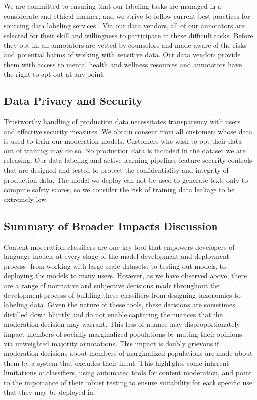 \documentclass[letterpaper]{article} %
\begin{document}
We are committed to ensuring that our labeling tasks are managed in a considerate and ethical manner, and we strive to follow current best practices for sourcing data labeling services \cite{pai2021}. Via our data vendors, all of our annotators are selected for their skill and willingness to participate in these difficult tasks. Before they opt in, all annotators are vetted by counselors and made aware of the risks and potential harms of working with sensitive data.  Our data vendors provide them with access to mental health and wellness resources and annotators have the right to opt out at any point.


\subsection{Data Privacy and Security}

Trustworthy handling of production data necessitates transparency with users and effective security measures. We obtain consent from all customers whose data is used to train our moderation models. Customers who wish to opt their data out of training may do so. No production data is included in the dataset we are releasing. Our data labeling and active learning pipelines feature security controls that are designed and tested to protect the confidentiality and integrity of production data. The model we deploy can not be used to generate text, only to compute safety scores, so we consider the risk of training data leakage to be extremely low.


\subsection{Summary of Broader Impacts Discussion}

Content moderation classifiers are one key tool that empowers developers of language models at every stage of the model development and deployment process- from working with large-scale datasets, to testing out models, to deploying the models to many users. However, as we have observed above, there are a range of normative and subjective decisions made throughout the development process of building these classifiers from designing taxonomies to labeling data. Given the nature of these tools, these decisions are sometimes distilled down bluntly and do not enable capturing the nuances that the moderation decision may warrant. This loss of nuance may disproportionately impact members of socially marginalized populations by muting their opinions via unweighted majority annotations. This impact is doubly grievous if moderation decisions about members of marginalized populations are made about them by a system that excludes their input. This highlights some inherent limitations of classifiers, using automated tools for content moderation, and point to the importance of their robust testing to ensure suitability for each specific use that they may be deployed in. 
\end{document}
